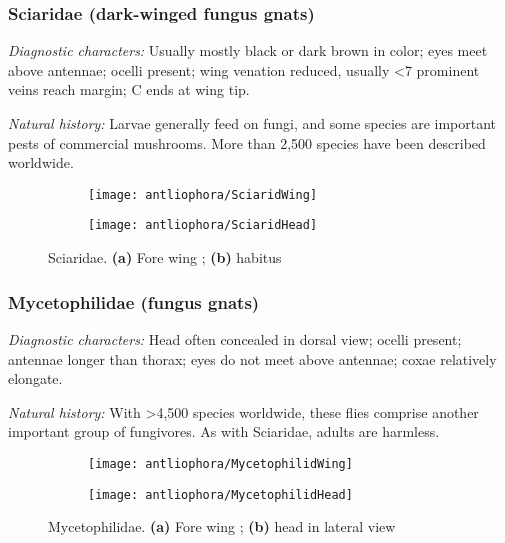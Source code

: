 \subsubsection{Sciaridae (dark-winged fungus gnats)}
\noindent{}\textit{Diagnostic characters:} Usually mostly black or dark brown in color; eyes meet above antennae; ocelli present; wing venation reduced, usually \textless7 prominent veins reach margin; C ends at wing tip.\vspace{3mm}

\noindent{}\textit{Natural history:} Larvae generally feed on fungi, and some species are important pests of commercial mushrooms. More than 2,500 species have been described worldwide.

\begin{figure}[ht!]
    \centering
    \begin{subfigure}[ht!]{0.45\textwidth}
        \texttt{[image: antliophora/SciaridWing]}
        \caption{}
        \label{fig:sciarid1}
    \end{subfigure}
    \qquad
    \begin{subfigure}[ht!]{0.25\textwidth}
        \texttt{[image: antliophora/SciaridHead]}
        \caption{}
        \label{fig:sciarid2}
    \end{subfigure}
    \caption{Sciaridae. \textbf{(a)} Fore wing \citep[][Fig. 15.19]{mcalpine1981manual}; \textbf{(b)} habitus \citep[][Fig. 15.4]{mcalpine1981manual}}\label{fig:sciarids}
\end{figure}

\subsubsection{Mycetophilidae (fungus gnats)}
\noindent{}\textit{Diagnostic characters:} Head often concealed in dorsal view; ocelli present; antennae longer than thorax; eyes do not meet above antennae; coxae relatively elongate.\vspace{3mm}

\noindent{}\textit{Natural history:} With \textgreater4,500 species worldwide, these flies comprise another important group of fungivores. As with Sciaridae, adults are harmless.

\begin{figure}[ht!]
    \centering
    \begin{subfigure}[ht!]{0.45\textwidth}
        \texttt{[image: antliophora/MycetophilidWing]}
        \caption{}
        \label{fig:mycetophilid1}
    \end{subfigure}
    \qquad
    \begin{subfigure}[ht!]{0.27\textwidth}
        \texttt{[image: antliophora/MycetophilidHead]}
        \caption{}
        \label{fig:mycetophilid2}
    \end{subfigure}
    \caption{Mycetophilidae. \textbf{(a)} Fore wing \citep[][Fig. 14.24]{mcalpine1981manual}; \textbf{(b)} head in lateral view \citep[][Fig. 13.1]{mcalpine1981manual}}\label{fig:mycetophilids}
\end{figure}

